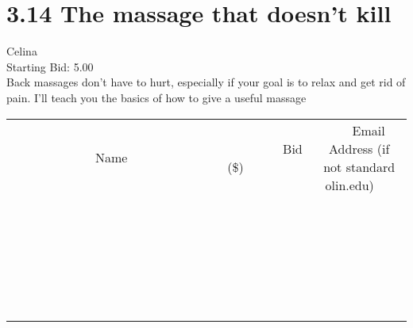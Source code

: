 \documentclass[11pt]{article}
\begin{document}
					\section*{3.14 The massage that doesn't kill}
					Celina \\
					Starting Bid: 5.00 \\
					Back massages don't have to hurt, especially if your goal is to relax and get rid of pain. I'll teach you the basics of how to give a useful massage \\
					[6ex]
					\begin{tabular}{c c c}
						~~~~~~~~~~~~~Name~~~~~~~~~~~~~ & ~~~~~~~~~Bid (\$)~~~~~~~~~ & ~~~Email Address (if not standard olin.edu)~~~ \\
				
 & & \\
\hline
 & & \\
\hline
 & & \\
\hline
 & & \\
\hline
 & & \\
\hline
 & & \\
\hline
 & & \\
\hline
 & & \\
\hline
 & & \\
\hline
 & & \\
\hline
 & & \\
\hline
 & & \\
\hline
 & & \\
\hline
 & & \\
\hline
 & & \\
\hline
 & & \\
\hline
 & & \\
\hline
 & & \\
\hline
 & & \\
\hline
 & & \\
\hline
 & & \\
\hline
 & & \\
\hline
 & & \\
\hline
 & & \\
\hline
 & & \\
\hline
 & & \\
\hline
					\end{tabular}
					\clearpage
				
\end{document}
